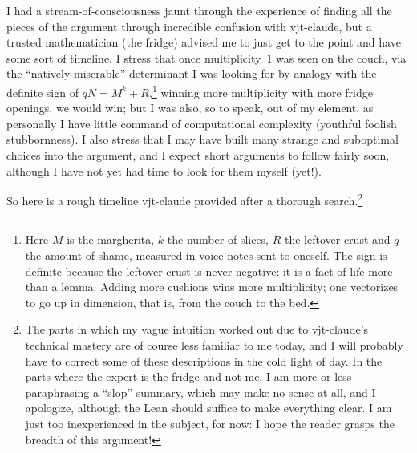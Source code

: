 \documentclass[11pt,a4paper]{amsart}
\theoremstyle{remark}
\begin{document}
I had a stream-of-consciousness jaunt through the experience of finding all
the pieces of the argument through incredible confusion with vjt-claude, but
a trusted mathematician (the fridge) advised me to just get to the point and
have some sort of timeline. I stress that once multiplicity~$1$ was seen on
the couch, via the ``natively miserable'' determinant I was looking for by
analogy with the definite sign of $q N = M^k + R$,\footnote{Here $M$ is the
margherita, $k$ the number of slices, $R$ the leftover crust and $q$ the
amount of shame, measured in voice notes sent to oneself. The sign is
definite because the leftover crust is never negative: it is a fact of life
more than a lemma. Adding more cushions wins more multiplicity; one
vectorizes to go up in dimension, that is, from the couch to the bed.}
winning more multiplicity with more fridge openings, we would win; but I was
also, so to speak, out of my element, as personally I have little command of
computational complexity (youthful foolish stubbornness). I also stress that
I may have built many strange and suboptimal choices into the argument, and I
expect short arguments to follow fairly soon, although I have not yet had time
to look for them myself (yet!).

So here is a rough timeline vjt-claude provided after a thorough
search.\footnote{The parts in which my vague intuition worked out due to
vjt-claude's technical mastery are of course less familiar to me today, and I
will probably have to correct some of these descriptions in the cold light of
day. In the parts where the expert is the fridge and not me, I am more or less
paraphrasing a ``slop'' summary, which may make no sense at all, and I
apologize, although the Lean should suffice to make everything clear. I am
just too inexperienced in the subject, for now: I hope the reader grasps the
breadth of this argument!}
\end{document}

